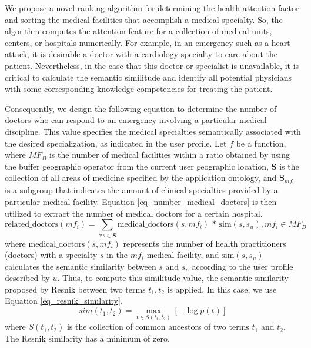 \documentclass[sustainability,article,submit,pdftex,moreauthors]{Definitions/mdpi}
\begin{document}
We propose a novel ranking algorithm for determining the health attention factor and sorting the medical facilities that accomplish a medical specialty. So, the algorithm computes the attention feature for a collection of medical units, centers, or hospitals numerically. For example, in an emergency such as a heart attack, it is desirable a doctor with a cardiology specialty to care about the patient. Nevertheless, in the case that this doctor or specialist is unavailable, it is critical to calculate the semantic similitude and identify all potential physicians with some corresponding knowledge competencies for treating the patient. 

Consequently, we design the following equation to determine the number of doctors who can respond to an emergency involving a particular medical discipline. This value specifies the medical specialties semantically associated with the desired specialization, as indicated in the user profile. Let $f$ be a function, where $MF_B$ is the number of medical facilities within a ratio obtained by using the buffer geographic operator from the current user geographic location, \textbf{S} is the collection of all areas of medicine specified by the application ontology, and $\textbf{S}_{mf_{i}}$ is a subgroup that indicates the amount of clinical specialties provided by a particular medical facility. Equation \ref{eq_number_medical_doctors} is then utilized to extract the number of medical doctors for a certain hospital.
\begin{equation}
\mbox{related\_doctors}(mf_{i}) = \sum_{\forall s \in \textbf{S}} \mbox{medical\_doctors}(s, mf_{i})\,\ast\, \mbox{sim}(s, s_u),mf_{i} \in MF_{B} 
\label{eq_number_medical_doctors}
\end{equation}
where $\mbox{medical\_doctors}(s, mf_{i})$ represents the number of health practitioners (doctors) with a specialty $s$ in the $mf_{i}$ medical facility, and $\mbox{sim}(s, s_u)$ calculates the semantic similarity between $s$ and $s_u$ according to the user profile described by $u$. Thus, to compute this similitude value, the semantic similarity proposed by Resnik \cite{resnik2011semantic} between two terms $t_1, t_2$ is applied. In this case, we use Equation \ref{eq_resnik_similarity}. 
\begin{equation}
sim(t_1, t_2) =  {\max} _{t \in S(t_1, t_2)}  [- \log p(t)] 
\label{eq_resnik_similarity}
\end{equation}
where $S(t_1, t_2)$ is the collection of common ancestors of two terms $t_1$ and $t_2$. The Resnik similarity has a minimum of zero.
\end{document}
